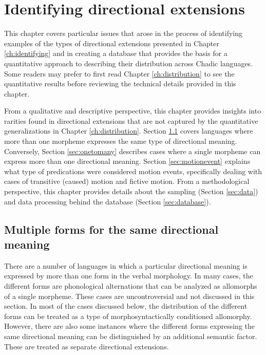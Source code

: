 \chapter{Identifying directional extensions} \label{ch:identifying2}

This chapter covers particular issues that arose in the process of identifying examples of the types of directional extensions presented in Chapter \ref{ch:identifying} and in creating a database that provides the basis for a quantitative approach to describing their distribution across Chadic languages. Some readers may prefer to first read Chapter \ref{ch:distribution} to see the quantitative results before reviewing the technical details provided in this chapter.

From a qualitative and descriptive perspective, this chapter provides insights into rarities found in directional extensions that are not captured by the quantitative generalizations in Chapter \ref{ch:distribution}. Section \ref{sec:multiple} covers languages where more than one morpheme expresses the same type of directional meaning. Conversely, Section \ref{sec:onetomany} describes cases where a single morpheme can express more than one directional meaning. Section \ref{sec:motionevent} explains what type of predications were considered motion events, specifically dealing with cases of transitive (caused) motion and fictive motion. From a methodological perspective, this chapter provides details about the sampling (Section \ref{sec:data}) and data processing behind the database (Section \ref{sec:database}). 

\section{Multiple forms for the same directional meaning} \label{sec:multiple}

There are a number of languages in which a particular directional meaning is expressed by more than one form in the verbal morphology. In many cases, the different forms are phonological alternations that can be analyzed as allomorphs of a single morpheme. These cases are uncontroversial and not discussed in this section. In most of the cases discussed below, the distribution of the different forms can be treated as a type of morphosyntactically conditioned allomorphy. However, there are also some instances where the different forms expressing the same directional meaning can be distinguished by an additional semantic factor. These are treated as separate directional extensions.

